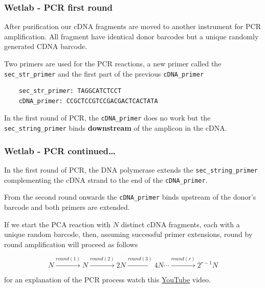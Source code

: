 \documentclass{beamer}
\newcommand{\pdfnarration}[1]{%
\onslide*<\value{beamerpauses}>{\pdfmargincomment[style=note,author=narration]{#1}}%
}
\renewcommand{\pdfnarration}[1]{}
\begin{document}
\begin{frame}[fragile]
\frametitle{ Wetlab -  PCR first round}

After purification our cDNA  fragments are moved to another instrument for PCR amplification.
All fragment have identical donor barcodes but a unique randomly generated CDNA barcode. 

\bigskip
Two primers are used for the PCR reactions, a new primer called the {\tt sec\_str\_primer}
and the first part of the previous {\tt cDNA\_primer}

\tiny
\begin{verbatim}
    sec_str_primer: TAGGCATCTCCT
    cDNA_primer: CCGCTCCGTCCGACGACTCACTATA
\end{verbatim}
\normalsize

In the first round of PCR, the {\tt cDNA\_primer} does no work  
but the {\tt sec\_string\_primer} binds 
{\bf downstream} of the amplicon in the cDNA. 

\pdfnarration{
[[slnc 1000]]
After purification our CDNA  fragments are moved to another instrument for PCR amplification.
[[sinc 1000]]
All fragment have identical donor barcodes but a unique randomly generated CDNA barcode. 
[[sinc 1000]]
Two primers are used for the PCR reactions.
The one being a new primer, called [[emph +]]  the secondary string primer [[emph -]],
and the other being the first part of the previous CDNA primer.
[[sinc 1000]]
In the first round of PCR, the secondary string primer binds 
downstream of the ampli-con in the CDNA
 complementing the CDNA strand 
to the end of the CDNA primer.
[[sinc 2000]]
}

\end{frame}

\begin{frame}[fragile]
\frametitle{ Wetlab -  PCR continued\ldots   }

\alert<1> 

In the first round of PCR, the DNA polymerase extends the 
{\tt sec\_string\_primer} complementing the cDNA strand 
to the end of the {\tt cDNA\_primer}.

\bigskip
From the second round onwards the {\tt cDNA\_primer} binds upstream
of the donor's barcode and both primers are extended.

\bigskip
If we start the PCA reaction with $N$ distinct cDNA fragments,
each with a unique random barcode, then,  assuming 
successful primer extensions,
round by round amplification will proceed as follows

$$ N \xrightarrow{round(1)} N   \xrightarrow{round(2)} 2N  \xrightarrow{round(3)}  4N  
 \cdots \xrightarrow{round(r)} 2^{r-1} N $$

for an explanation of the PCR process
 watch this \href{https://www.youtube.com/watch?v=c07_5BfIDTw}{\color{red} YouTube} video.


\end{frame}
\end{document}
